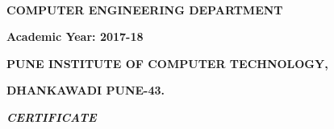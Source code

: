 \documentclass[12pt]{article}
\begin{document}
\begin{adjustwidth}{1.0in}{0.0in}
\begin{justify}
\ \ \ \ \ \ \ \ \ \ \ \ \ \ \ \ \ \  
\end{justify}\par

\end{adjustwidth}

 \par

 \par

 \par

\begin{Center}
{\fontsize{20pt}{24.0pt}\selectfont \textbf{COMPUTER ENGINEERING DEPARTMENT}\par}
\end{Center}\par

\begin{Center}
{\fontsize{20pt}{24.0pt}\selectfont \textbf{Academic Year: 2017-18}\par}


\newpage

\end{Center}\par


\vspace{\baselineskip}
\begin{Center}
{\fontsize{20pt}{24.0pt}\selectfont \textbf{ }\par}
\end{Center}\par

\begin{Center}
{\fontsize{14pt}{16.8pt}\selectfont \textbf{PUNE INSTITUTE OF COMPUTER TECHNOLOGY,}\par}
\end{Center}\par

\begin{Center}
{\fontsize{14pt}{16.8pt}\selectfont \textbf{DHANKAWADI PUNE-43.}\par}
\end{Center}\par


\vspace{\baselineskip}
\begin{Center}
{\fontsize{26pt}{31.2pt}\selectfont \textbf{\textit{CERTIFICATE}}{\fontsize{14pt}{16.8pt}\selectfont  \par}\par}
\end{Center}\par
\end{document}
